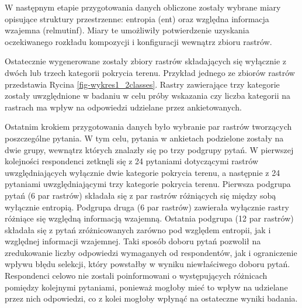 \documentclass{amuthesis}
\begin{document}
W następnym etapie przygotowania danych obliczone zostały wybrane miary
opisujące struktury przestrzenne: entropia (ent) oraz względna
informacja wzajemna (relmutinf). Miary te umożliwiły potwierdzenie
uzyskania oczekiwanego rozkładu kompozycji i konfiguracji wewnątrz
zbioru rastrów.

Ostatecznie wygenerowane zostały zbiory rastrów składających się
wyłącznie z dwóch lub trzech kategorii pokrycia terenu. Przykład jednego
ze zbiorów rastrów przedstawia Rycina \ref{fig-wykres1_2classes}. Rastry
zawierające trzy kategorie zostały uwzględnione w badaniu w celu próby
wskazania czy liczba kategorii na rastrach ma wpływ na odpowiedzi
udzielane przez ankietowanych.

Ostatnim krokiem przygotowania danych było wybranie par rastrów
tworzących poszczególne pytania. W tym celu, pytania w ankietach
podzielone zostały na dwie grupy, wewnątrz których znalazły się po trzy
podgrupy pytań. W pierwszej kolejności respondenci zetknęli się z 24
pytaniami dotyczącymi rastrów uwzględniających wyłącznie dwie kategorie
pokrycia terenu, a następnie z 24 pytaniami uwzględniającymi trzy
kategorie pokrycia terenu. Pierwsza podgrupa pytań (6 par rastrów)
składała się z par rastrów różniących się między sobą wyłącznie
entropią. Podgrupa druga (6 par rastrów) zawierała wyłącznie rastry
różniące się względną informacją wzajemną. Ostatnia podgrupa (12 par
rastrów) składała się z pytań zróżnicowanych zarówno pod względem
entropii, jak i względnej informacji wzajemnej. Taki sposób doboru pytań
pozwolił na zredukowanie liczby odpowiedzi wymaganych od respondentów,
jak i ograniczenie wpływu błędu selekcji, który powstałby w wyniku
niewłaściwego doboru pytań. Respondenci celowo nie zostali poinformowani
o występujących różnicach pomiędzy kolejnymi pytaniami, ponieważ mogłoby
mieć to wpływ na udzielane przez nich odpowiedzi, co z kolei mogłoby
wpłynąć na ostateczne wyniki badania.
\end{document}
